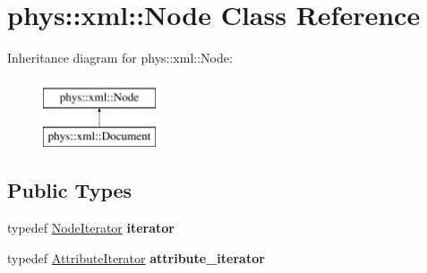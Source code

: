 \hypertarget{classphys_1_1xml_1_1Node}{
\section{phys::xml::Node Class Reference}
\label{d7/d0a/classphys_1_1xml_1_1Node}
}
Inheritance diagram for phys::xml::Node:\begin{figure}[H]
\begin{center}
\leavevmode
\includegraphics[height=2.000000cm]{d7/d0a/classphys_1_1xml_1_1Node}
\end{center}
\end{figure}
\subsection*{Public Types}
\begin{DoxyCompactItemize}
\item 
\hypertarget{classphys_1_1xml_1_1Node_a0da067636c89829a111dd51037cea6b3}{
typedef \hyperlink{classphys_1_1xml_1_1NodeIterator}{NodeIterator} {\bfseries iterator}}
\label{d7/d0a/classphys_1_1xml_1_1Node_a0da067636c89829a111dd51037cea6b3}

\item 
\hypertarget{classphys_1_1xml_1_1Node_a3b37ee9a716fc3a6cd92733ccf28f26a}{
typedef \hyperlink{classphys_1_1xml_1_1AttributeIterator}{AttributeIterator} {\bfseries attribute\_\-iterator}}
\label{d7/d0a/classphys_1_1xml_1_1Node_a3b37ee9a716fc3a6cd92733ccf28f26a}

\end{DoxyCompactItemize}
